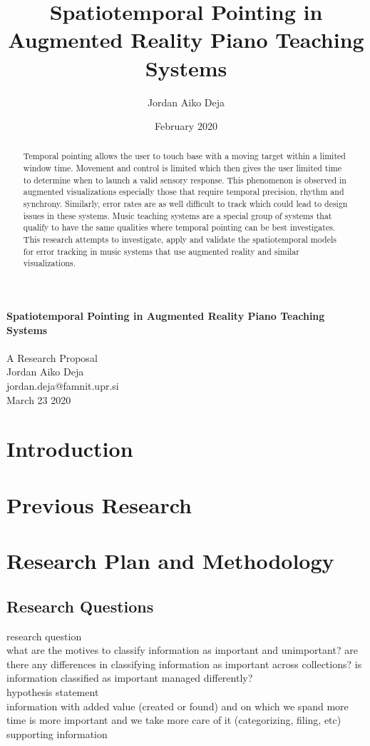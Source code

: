 \documentclass{article}
\title{Spatiotemporal Pointing in Augmented Reality Piano Teaching Systems}
\author{Jordan Aiko Deja}
\begin{document}
\begin{center}
\large \textbf{Spatiotemporal Pointing in Augmented Reality Piano Teaching Systems}
\\            
\vspace{0.5cm}\\
A Research Proposal\\
\vspace{0.5cm}
Jordan Aiko Deja\\
jordan.deja@famnit.upr.si\\
\vspace{0.5cm}
March 23 2020
\vspace{0.5cm}
\end{center}
\nocite{*}

\begin{abstract}
     Temporal pointing allows the user to touch base with a moving target within a limited window time. Movement and control is limited which then gives the user limited time to determine when to launch a valid sensory response. This phenomenon is observed in augmented visualizations especially those that require temporal precision, rhythm and synchrony. Similarly, error rates are as well difficult to track which could lead to design issues in these systems. Music teaching systems are a special group of systems that qualify to have the same qualities where temporal pointing can be best investigates. This research attempts to investigate, apply and validate the spatiotemporal models for error tracking in music systems that use augmented reality and similar visualizations. 
\end{abstract}
\date{February 2020}

\section{Introduction}
\section{Previous Research}
\section{Research Plan and Methodology}
\subsection{Research Questions}
research question\\
what are the motives to classify information as important and unimportant? are there any differences in classifying information as important across collections? is information classified as important managed differently? \\
hypothesis statement\\
information with added value (created or found) and on which we spand more time is more important and we take more care of it (categorizing, filing, etc)\\
supporting information\\
\end{document}
